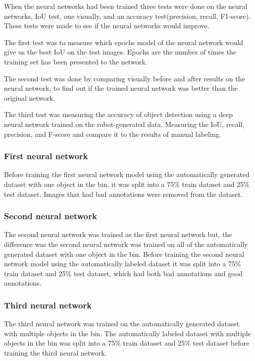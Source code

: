 When the neural networks had been trained three tests were done on the neural networks, IoU test, one visually, and an accuracy test(precision, recall, F1-score). These tests were made to see if the neural networks would improve. 

The first test was to measure which epochs model of the neural network would give us the best IoU on the test images. Epochs are the number of times the training set has been presented to the network.

The second test was done by comparing visually before and after results on the neural network, to find out if the trained neural network was better than the original network.

The third test was measuring the accuracy of object detection using a deep neural network trained on the robot-generated data. Measuring the IoU, recall, precision, and F-score and compare it to the results of manual labeling. 


\subsubsection{First neural network}
Before training the first neural network model using the automatically generated dataset with one object in the bin, it was split into a 75\% train dataset and 25\% test dataset. Images that had bad annotations were removed from the dataset. 


\subsubsection{Second neural network}
The second neural network was trained as the first neural network but, the difference was the second neural network was trained on all of the automatically generated dataset with one object in the bin. Before training the second neural network model using the automatically labeled dataset it was split into a 75\% train dataset and 25\% test dataset, which had both bad annotations and good annotations. 



\subsubsection{Third neural network}
The third neural network was trained on the automatically generated dataset with multiple objects in the bin. The automatically labeled dataset with multiple objects in the bin was split into a 75\% train dataset and 25\% test dataset before training the third neural network. 